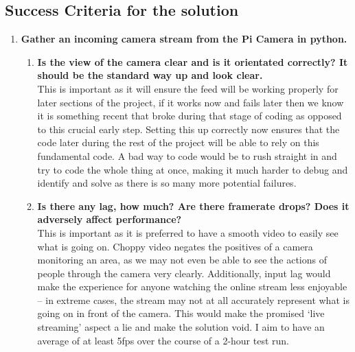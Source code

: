 \documentclass[9pt]{article}
\begin{document}
\begin{small}
	\subsection{Success Criteria for the solution}\label{success}
	\begin{enumerate}
		\setlength{\itemsep}{4pt}
		\setlength{\parskip}{0pt}
		\item \textbf{Gather an incoming camera stream from the Pi Camera in python.}
		\begin{enumerate}
			\item \textbf{Is the view of the camera clear and is it orientated correctly? It should be the standard way up and look clear.}\\
				This is important as it will ensure the feed will be working properly for later sections of the project, if it works now and fails later then we know it is something recent that broke during that stage of coding as opposed to this crucial early step. Setting this up correctly now ensures that the code later during the rest of the project will be able to rely on this fundamental code. A bad way to code would be to rush straight in and try to code the whole thing at once, making it much harder to debug and identify and solve as there is so many more potential failures.
			\item \textbf{Is there any lag, how much? Are there framerate drops? Does it adversely affect performance?}\\
				This is important as it is preferred to have a smooth video to easily see what is going on. Choppy video negates the positives of a camera monitoring an area, as we may not even be able to see the actions of people through the camera very clearly. Additionally, input lag would make the experience for anyone watching the online stream less enjoyable – in extreme cases, the stream may not at all accurately represent what is going on in front of the camera. This would make the promised ‘live streaming’ aspect a lie and make the solution void. I aim to have an average of at least 5fps over the course of a 2-hour test run.
		\end{enumerate}
		

\end{enumerate}
\end{small}
\end{document}
